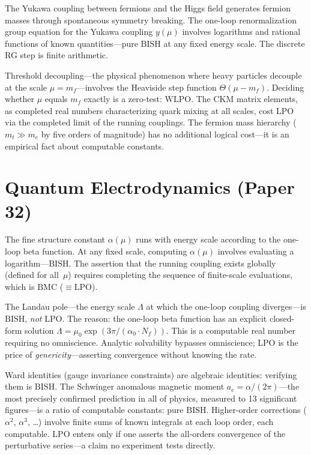 \documentclass[11pt,a4paper]{report}
\theoremstyle{plain}
\theoremstyle{definition}
\theoremstyle{remark}
\newcommand{\BISH}{\mathrm{BISH}}
\newcommand{\WLPO}{\mathrm{WLPO}}
\newcommand{\LPO}{\mathrm{LPO}}
\newcommand{\BMC}{\mathrm{BMC}}
\begin{document}
The Yukawa coupling between fermions and the Higgs field generates fermion masses through spontaneous symmetry breaking. The one-loop renormalization group equation for the Yukawa coupling $y(\mu)$ involves logarithms and rational functions of known quantities---pure $\BISH$ at any fixed energy scale. The discrete RG step is finite arithmetic.

Threshold decoupling---the physical phenomenon where heavy particles decouple at the scale $\mu = m_f$---involves the Heaviside step function $\Theta(\mu - m_f)$. Deciding whether $\mu$ equals $m_f$ exactly is a zero-test: $\WLPO$. The CKM matrix elements, as completed real numbers characterizing quark mixing at all scales, cost $\LPO$ via the completed limit of the running couplings. The fermion mass hierarchy ($m_t \gg m_e$ by five orders of magnitude) has no additional logical cost---it is an empirical fact about computable constants.

\section{Quantum Electrodynamics (Paper 32)}

The fine structure constant $\alpha(\mu)$ runs with energy scale according to the one-loop beta function. At any fixed scale, computing $\alpha(\mu)$ involves evaluating a logarithm---$\BISH$. The assertion that the running coupling exists globally (defined for all~$\mu$) requires completing the sequence of finite-scale evaluations, which is $\BMC$ ($\equiv \LPO$).

The Landau pole---the energy scale $\Lambda$ at which the one-loop coupling diverges---is $\BISH$, \emph{not} $\LPO$. The reason: the one-loop beta function has an explicit closed-form solution $\Lambda = \mu_0 \exp(3\pi/(\alpha_0 \cdot N_f))$. This is a computable real number requiring no omniscience. Analytic solvability bypasses omniscience; $\LPO$ is the price of \emph{genericity}---asserting convergence without knowing the rate.

Ward identities (gauge invariance constraints) are algebraic identities: verifying them is $\BISH$. The Schwinger anomalous magnetic moment $a_e = \alpha/(2\pi)$---the most precisely confirmed prediction in all of physics, measured to 13 significant figures---is a ratio of computable constants: pure $\BISH$. Higher-order corrections ($\alpha^2$, $\alpha^3$, \ldots) involve finite sums of known integrals at each loop order, each computable. $\LPO$ enters only if one asserts the all-orders convergence of the perturbative series---a claim no experiment tests directly.
\end{document}
